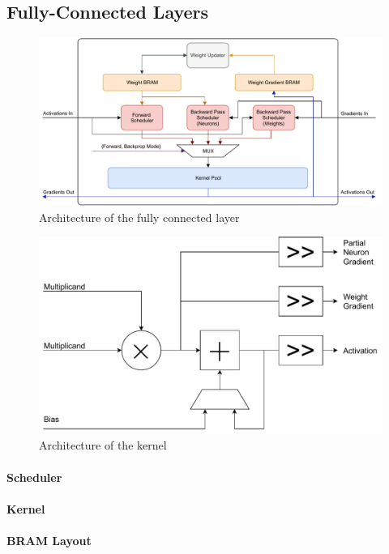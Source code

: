 \subsection{Fully-Connected Layers}

\begin{figure}
	\centering 
	\includegraphics[width=\textwidth]{figures/fully_connected_arch}
	\caption{Architecture of the fully connected layer}\label{fc-arch}
\end{figure}

\begin{figure}
	\centering 
	\includegraphics[width=5in]{figures/kernel_arch}
	\caption{Architecture of the kernel}\label{kernel-arch}
\end{figure}
\paragraph{Scheduler}
\paragraph{Kernel}
\paragraph{BRAM Layout}

